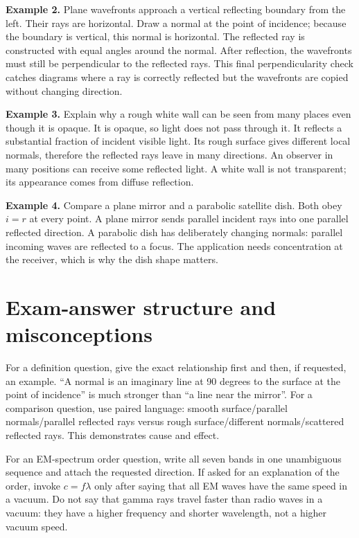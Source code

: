 \documentclass[10pt,a4paper]{article}
\begin{document}
\textbf{Example 2.} Plane wavefronts approach a vertical reflecting boundary from the left. Their rays are horizontal. Draw a normal at the point of incidence; because the boundary is vertical, this normal is horizontal. The reflected ray is constructed with equal angles around the normal. After reflection, the wavefronts must still be perpendicular to the reflected rays. This final perpendicularity check catches diagrams where a ray is correctly reflected but the wavefronts are copied without changing direction.

\textbf{Example 3.} Explain why a rough white wall can be seen from many places even though it is opaque. It is opaque, so light does not pass through it. It reflects a substantial fraction of incident visible light. Its rough surface gives different local normals, therefore the reflected rays leave in many directions. An observer in many positions can receive some reflected light. A white wall is not transparent; its appearance comes from diffuse reflection.

\textbf{Example 4.} Compare a plane mirror and a parabolic satellite dish. Both obey $i=r$ at every point. A plane mirror sends parallel incident rays into one parallel reflected direction. A parabolic dish has deliberately changing normals: parallel incoming waves are reflected to a focus. The application needs concentration at the receiver, which is why the dish shape matters.

\section{Exam-answer structure and misconceptions}
For a definition question, give the exact relationship first and then, if requested, an example. ``A normal is an imaginary line at 90 degrees to the surface at the point of incidence'' is much stronger than ``a line near the mirror''. For a comparison question, use paired language: smooth surface/parallel normals/parallel reflected rays versus rough surface/different normals/scattered reflected rays. This demonstrates cause and effect.

For an EM-spectrum order question, write all seven bands in one unambiguous sequence and attach the requested direction. If asked for an explanation of the order, invoke $c=f\lambda$ only after saying that all EM waves have the same speed in a vacuum. Do not say that gamma rays travel faster than radio waves in a vacuum: they have a higher frequency and shorter wavelength, not a higher vacuum speed.
\end{document}
